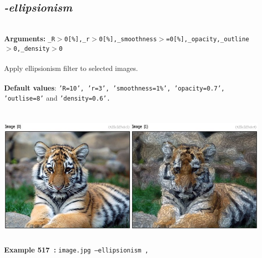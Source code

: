 \documentclass[a4paper,11pt,twoside]{book}
\begin{document}
\subsection{\emph{-ellipsionism} }\vspace*{-0.5em}
~\\\textbf{Arguments: } 
{\small \texttt{\_R$>$0[\%],\_r$>$0[\%],\_smoothness$>$=0[\%],\_opacity,\_outline$>$0,\_density$>$0}}\\~\\
Apply ellipsionism filter to selected images.
~\\~\\\textbf{Default values}: {\small \texttt{'R=10', 'r=3', 'smoothness=1\%', 'opacity=0.7', 'outlise=8'} and \texttt{'density=0.6'.}}
\begin{center}\includegraphics[keepaspectratio=true,height=7cm,width=\textwidth]{img/gmic_def517.jpg}\\
{\footnotesize \textbf{Example 517~:} \texttt{image.jpg --ellipsionism ,}}
\end{center}
\end{document}
